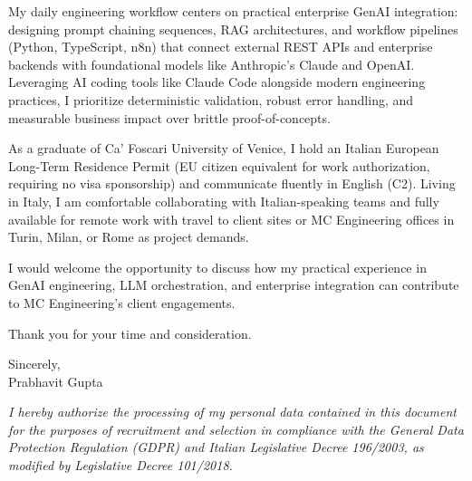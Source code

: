 \documentclass[11pt,a4paper]{article}
\begin{document}
My daily engineering workflow centers on practical enterprise GenAI integration: designing prompt chaining sequences, RAG architectures, and workflow pipelines (Python, TypeScript, n8n) that connect external REST APIs and enterprise backends with foundational models like Anthropic's Claude and OpenAI. Leveraging AI coding tools like Claude Code alongside modern engineering practices, I prioritize deterministic validation, robust error handling, and measurable business impact over brittle proof-of-concepts.

As a graduate of Ca' Foscari University of Venice, I hold an Italian European Long-Term Residence Permit (EU citizen equivalent for work authorization, requiring no visa sponsorship) and communicate fluently in English (C2). Living in Italy, I am comfortable collaborating with Italian-speaking teams and fully available for remote work with travel to client sites or MC Engineering offices in Turin, Milan, or Rome as project demands.

I would welcome the opportunity to discuss how my practical experience in GenAI engineering, LLM orchestration, and enterprise integration can contribute to MC Engineering's client engagements.

Thank you for your time and consideration.

Sincerely,\\
Prabhavit Gupta

\vspace{0.8em}
{\footnotesize \textit{I hereby authorize the processing of my personal data contained in this document for the purposes of recruitment and selection in compliance with the General Data Protection Regulation (GDPR) and Italian Legislative Decree 196/2003, as modified by Legislative Decree 101/2018.}\par}
\end{document}
